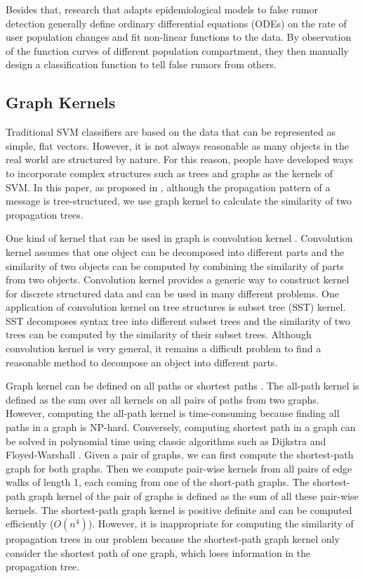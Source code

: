 Besides that, research that adapts epidemiological models
\cite{jin2013epidemiological,bao2013new}
to false rumor detection
generally define ordinary differential equations (ODEs) on the rate
of user population changes and fit non-linear functions to the data.
By observation of the function curves of different population compartment,
they then manually design a classification function to tell false rumors from
others.

\subsection{Graph Kernels}
Traditional SVM classifiers are based on the data that can be
represented as simple, flat vectors. However, it is not always reasonable
as many objects in the real world are structured by
nature\cite{gartner2003survey}.
For this reason, people have developed ways to incorporate complex structures
such as trees and graphs as the kernels of SVM.
In this paper, as proposed in ,
although the propagation pattern of a message is tree-structured,
we use graph kernel to calculate the similarity of two propagation trees.

One kind of kernel that can be used in graph is convolution kernel
\cite{haussler1999convolution}. Convolution kernel assumes that one
object can be decomposed into different parts and the similarity of
two objects can be computed by combining the similarity of parts from
two objects. Convolution kernel provides a generic way to construct
kernel for discrete structured data and can be used in many different
problems. One application of convolution kernel on tree structures is
subset tree (SST) kernel\cite{collins2002new}. SST decomposes syntax
tree into different subset trees and the similarity of two trees can be
computed by the similarity of their subset trees. Although convolution
kernel is very general, it remains a difficult problem to find a
reasonable method to decompose an object into different parts.

Graph kernel can be defined on all paths or shortest paths
\cite{borgwardt2005shortest}. The all-path kernel is defined as the sum
over all kernels on all pairs of paths from two graphs. However,
computing the all-path kernel is time-consuming because
finding all paths in a graph is NP-hard.
Conversely, computing shortest path in a graph can be solved in
polynomial time using classic algorithms such as Dijkstra
\cite{dijkstra1959note} and Floyed-Warshall
\cite{floyd1962algorithm,warshall1962theorem}.
Given a pair of graphs, we can first compute the shortest-path
graph for both graphs. Then we compute pair-wise kernels from all
pairs of edge walks of length 1, each coming from one of the short-path graphs.
The shortest-path graph kernel of the pair of graphs
is defined as the sum of all these pair-wise kernels.
The shortest-path graph kernel
is positive definite and can be computed efficiently ($O(n^4)$).
However, it is inappropriate for computing the similarity of
propagation trees in our problem
because the shortest-path graph kernel only consider the
shortest path of one graph, which loses information in the propagation tree.

